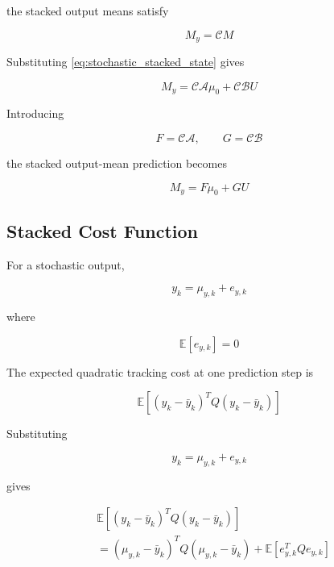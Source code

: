 the stacked output means satisfy

\begin{equation}
    M_y
    =
    \mathcal{C}M
\end{equation}

Substituting \cref{eq:stochastic_stacked_state} gives

\begin{equation}
    M_y
    =
    \mathcal{C}\mathcal{A}\mu_0
    +
    \mathcal{C}\mathcal{B}U
\end{equation}

Introducing

\begin{equation}
    F
    =
    \mathcal{C}\mathcal{A},
    \qquad
    G
    =
    \mathcal{C}\mathcal{B}
\end{equation}

the stacked output-mean prediction becomes

\begin{equation}
    \boxed{
        M_y
        =
        F\mu_0+GU
    }
    \label{eq:stochastic_stacked_output}
\end{equation}

\subsection{Stacked Cost Function}

For a stochastic output,

\begin{equation}
    y_k
    =
    \mu_{y,k}
    +
    e_{y,k}
\end{equation}

where

\begin{equation}
    \mathbb{E}[e_{y,k}]=0
\end{equation}

The expected quadratic tracking cost at one prediction step is

\begin{equation}
    \mathbb{E}
    \left[
        (y_k-\bar{y}_k)^T
        Q
        (y_k-\bar{y}_k)
    \right]
\end{equation}

Substituting

\begin{equation}
    y_k=\mu_{y,k}+e_{y,k}
\end{equation}

gives

\begin{align}
    &\mathbb{E}
    \left[
        (y_k-\bar{y}_k)^T
        Q
        (y_k-\bar{y}_k)
    \right]
    \nonumber\\
    &=
    (\mu_{y,k}-\bar{y}_k)^T
    Q
    (\mu_{y,k}-\bar{y}_k)
    +
    \mathbb{E}
    \left[
        e_{y,k}^T Qe_{y,k}
    \right]
\end{align}

